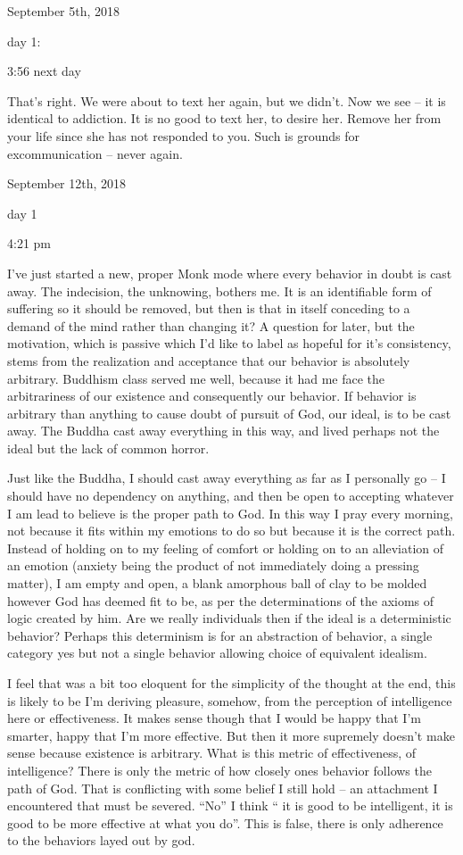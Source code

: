 \bigskip
\bigskip
September 5th, 2018

day 1:

3:56 next day

That's right. We were about to text her again, but we didn't. Now we see
-- it is identical to addiction. It is no good to text her, to desire
her. Remove her from your life since she has not responded to you. Such
is grounds for excommunication -- never again.

\bigskip
\bigskip
September 12th, 2018

day 1

4:21 pm

I've just started a new, proper Monk mode where every behavior in doubt
is cast away. The indecision, the unknowing, bothers me. It is an
identifiable form of suffering so it should be removed, but then is that
in itself conceding to a demand of the mind rather than changing it? A
question for later, but the motivation, which is passive which I'd like
to label as hopeful for it's consistency, stems from the realization and
acceptance that our behavior is absolutely arbitrary. Buddhism class
served me well, because it had me face the arbitrariness of our
existence and consequently our behavior. If behavior is arbitrary than
anything to cause doubt of pursuit of God, our ideal, is to be cast
away. The Buddha cast away everything in this way, and lived perhaps not
the ideal but the lack of common horror.

Just like the Buddha, I should cast away everything as far as I
personally go -- I should have no dependency on anything, and then be
open to accepting whatever I am lead to believe is the proper path to
God. In this way I pray every morning, not because it fits within my
emotions to do so but because it is the correct path. Instead of holding
on to my feeling of comfort or holding on to an alleviation of an
emotion (anxiety being the product of not immediately doing a pressing
matter), I am empty and open, a blank amorphous ball of clay to be
molded however God has deemed fit to be, as per the determinations of
the axioms of logic created by him. Are we really individuals then if
the ideal is a deterministic behavior? Perhaps this determinism is for
an abstraction of behavior, a single category yes but not a single
behavior allowing choice of equivalent idealism.

I feel that was a bit too eloquent for the simplicity of the thought at
the end, this is likely to be I'm deriving pleasure, somehow, from the
perception of intelligence here or effectiveness. It makes sense though
that I would be happy that I'm smarter, happy that I'm more effective.
But then it more supremely doesn't make sense because existence is
arbitrary. What is this metric of effectiveness, of intelligence? There
is only the metric of how closely ones behavior follows the path of God.
That is conflicting with some belief I still hold -- an attachment I
encountered that must be severed. ``No'' I think `` it is good to be
intelligent, it is good to be more effective at what you do''. This is
false, there is only adherence to the behaviors layed out by god.


